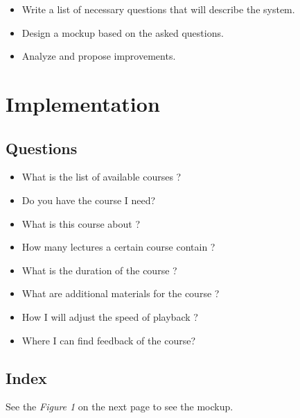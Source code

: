 \documentclass[12pt]{article}
\begin{document}
  \begin{itemize}
    \renewcommand{\labelitemi}{$\circ$}
    \item Write a list of necessary questions that will describe the system.
    \item Design a mockup based on the asked questions.
    \item Analyze and propose improvements.
  \end{itemize}


  \section{Implementation}

  \subsection{Questions}

  \begin{itemize}
    \renewcommand{\labelitemi}{$\circ$}
    \item What is the list of available courses ?
    \item Do you have the course I need?
    \item What is this course about ?
    \item How many lectures a certain course contain ?
    \item What is the duration of the course ?
    \item What are additional materials for the course ?
    \item How I will adjust the speed of playback ?
    \item Where I can find feedback of the course?
   \end{itemize}

   \subsection{Index}

   See the \textit{Figure 1} on the next page to see the mockup. \\

\end{document}
